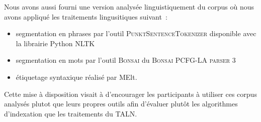 \documentclass[10pt,twoside]{article}
\begin{document}
     
     \begin{table}[!h]
      \centering
      \caption{Caractéristiques des thésaurus
               \label{tab:thesaurus}}
    \end{table}
  
   Nous avons aussi fourni une version analysée linguistiquement du corpus où nous avons appliqué les traitements lingusitiques suivant~: 
   \begin{itemize}
   \item segmentation en phrases par l’outil \textsc{PunktSentenceTokenizer} disponible avec la librairie Python NLTK
   \item segmentation en mots par l’outil  \textsc{Bonsai} du 
   \textsc{Bonsai PCFG-LA parser 3}
   \item étiquetage syntaxique réalisé par MElt.
   \end{itemize}
    Cette mise à disposition visait à d'encourager les participants à utiliser ces corpus analysés plutot que leurs propres outils afin d'évaluer plutôt les algorithmes d'indexation que les traitements du TALN. 
\end{document}
